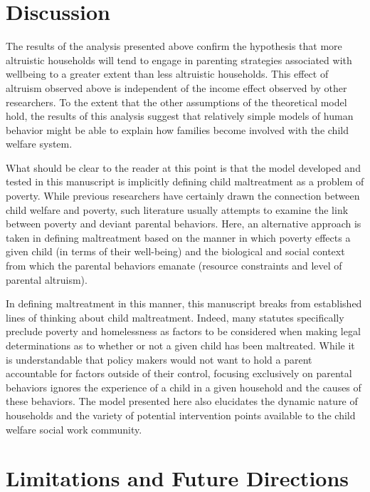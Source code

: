 \documentclass[review]{elsarticle}\usepackage[]{graphicx}\usepackage[]{color}
\begin{document}
\section{Discussion}\label{discussion}

The results of the analysis presented above confirm the hypothesis that
more altruistic households will tend to engage in parenting strategies
associated with wellbeing to a greater extent than less altruistic
households. This effect of altruism observed above is independent of the
income effect observed by other researchers. To the extent that the
other assumptions of the theoretical model hold, the results of this
analysis suggest that relatively simple models of human behavior might
be able to explain how families become involved with the child welfare
system.

What should be clear to the reader at this point is that the model
developed and tested in this manuscript is implicitly defining child
maltreatment as a problem of poverty. While previous researchers have
certainly drawn the connection between child welfare and poverty, such
literature usually attempts to examine the link between poverty and
deviant parental behaviors. Here, an alternative approach is taken in
defining maltreatment based on the manner in which poverty effects a
given child (in terms of their well-being) and the biological and social
context from which the parental behaviors emanate (resource constraints
and level of parental altruism).

In defining maltreatment in this manner, this manuscript breaks from
established lines of thinking about child maltreatment. Indeed, many
statutes specifically preclude poverty and homelessness as factors to be
considered when making legal determinations as to whether or not a given
child has been maltreated. While it is understandable that policy makers
would not want to hold a parent accountable for factors outside of their
control, focusing exclusively on parental behaviors ignores the
experience of a child in a given household and the causes of these
behaviors. The model presented here also elucidates the dynamic nature
of households and the variety of potential intervention points available
to the child welfare social work community.

\section{Limitations and Future
Directions}\label{limitations-and-future-directions}
\end{document}
